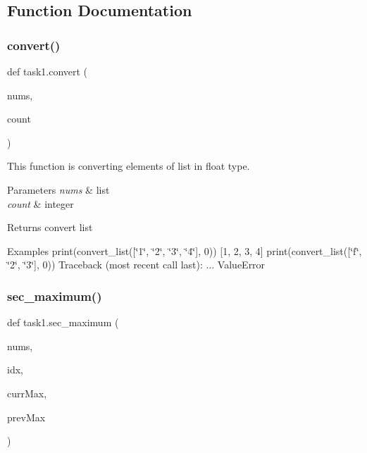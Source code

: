 \subsection{Function Documentation}
\mbox{\label{namespacetask1_add03bb5f88d4697c6bd0279a4b98ffb0}} 
\subsubsection{\texorpdfstring{convert()}{convert()}}
{\footnotesize\ttfamily def task1.\+convert (\begin{DoxyParamCaption}\item[{}]{nums,  }\item[{}]{count }\end{DoxyParamCaption})}



This function is converting elements of list in float type. 


\begin{DoxyParams}{Parameters}
{\em nums} & list \\
\hline
{\em count} & integer \\
\hline
\end{DoxyParams}
\begin{DoxyReturn}{Returns}
convert list 
\end{DoxyReturn}
\begin{DoxyParagraph}{Examples}
print(convert\+\_\+list(\mbox{[}\char`\"{}1\char`\"{}, \char`\"{}2\char`\"{}, \char`\"{}3\char`\"{}, \char`\"{}4\char`\"{}\mbox{]}, 0)) \mbox{[}1, 2, 3, 4\mbox{]} print(convert\+\_\+list(\mbox{[}\char`\"{}f\char`\"{}, \char`\"{}2\char`\"{}, \char`\"{}3\char`\"{}\mbox{]}, 0)) Traceback (most recent call last)\+: ... Value\+Error 
\end{DoxyParagraph}
\mbox{\label{namespacetask1_a4a5a08378d4ee5b9ee7ae4562c950029}} 
\subsubsection{\texorpdfstring{sec\+\_\+maximum()}{sec\_maximum()}}
{\footnotesize\ttfamily def task1.\+sec\+\_\+maximum (\begin{DoxyParamCaption}\item[{}]{nums,  }\item[{}]{idx,  }\item[{}]{curr\+Max,  }\item[{}]{prev\+Max }\end{DoxyParamCaption})}



